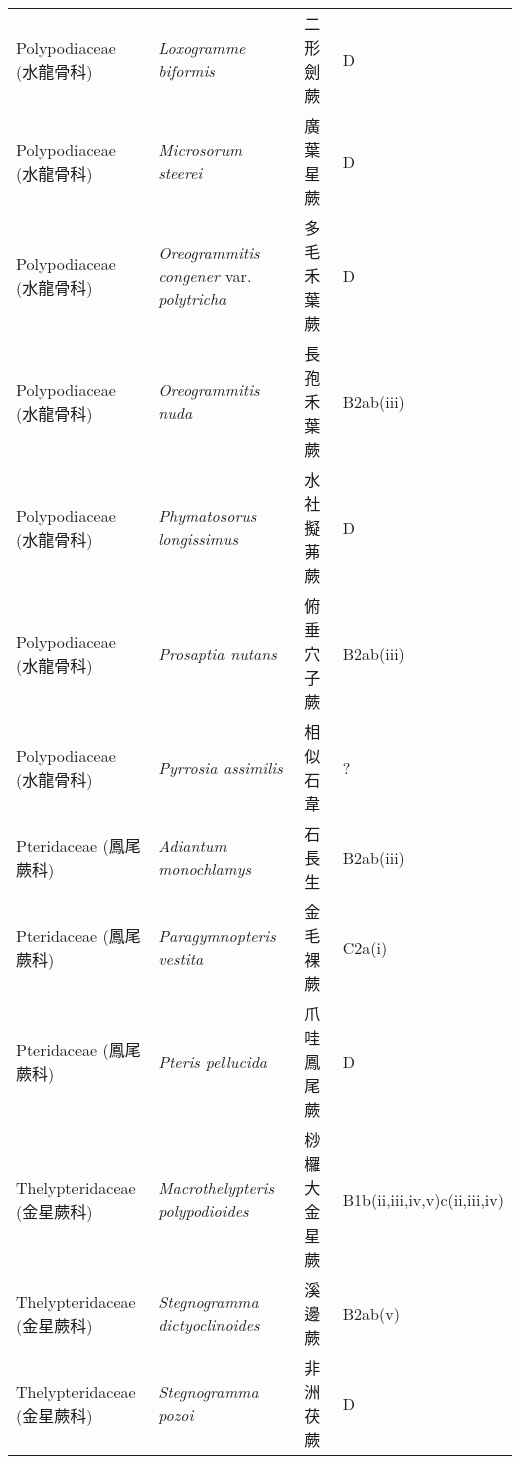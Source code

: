 \begin{longtable}{p{3cm}p{5cm}p{3cm}p{4cm}}
    Polypodiaceae (水龍骨科) & \textit{Loxogramme biformis}  & 二形劍蕨 & D \index{Loxogramme@\textit{Loxogramme}!biformis@\textit{biformis}}  \index{二形劍蕨} \\
    Polypodiaceae (水龍骨科) & \textit{Microsorum steerei}  & 廣葉星蕨 & D \index{Microsorum@\textit{Microsorum}!steerei@\textit{steerei}}  \index{廣葉星蕨} \\
    Polypodiaceae (水龍骨科) & \textit{Oreogrammitis congener} var. \textit{polytricha}  & 多毛禾葉蕨 & D \index{Oreogrammitis@\textit{Oreogrammitis}!congener@\textit{congener}!var. polytricha@var. \textit{polytricha}}  \index{多毛禾葉蕨} \\
    Polypodiaceae (水龍骨科) & \textit{Oreogrammitis nuda}  & 長孢禾葉蕨 & B2ab(iii) \index{Oreogrammitis@\textit{Oreogrammitis}!nuda@\textit{nuda}}  \index{長孢禾葉蕨} \\
    Polypodiaceae (水龍骨科) & \textit{Phymatosorus longissimus}  & 水社擬茀蕨 & D \index{Phymatosorus@\textit{Phymatosorus}!longissimus@\textit{longissimus}}  \index{水社擬茀蕨} \\
    Polypodiaceae (水龍骨科) & \textit{Prosaptia nutans}  & 俯垂穴子蕨 & B2ab(iii) \index{Prosaptia@\textit{Prosaptia}!nutans@\textit{nutans}}  \index{俯垂穴子蕨} \\
    Polypodiaceae (水龍骨科) & \textit{Pyrrosia assimilis}  & 相似石韋 & ? \index{Pyrrosia@\textit{Pyrrosia}!assimilis@\textit{assimilis}}  \index{相似石韋} \\
    Pteridaceae (鳳尾蕨科) & \textit{Adiantum monochlamys}  & 石長生 & B2ab(iii) \index{Adiantum@\textit{Adiantum}!monochlamys@\textit{monochlamys}}  \index{石長生} \\
    Pteridaceae (鳳尾蕨科) & \textit{Paragymnopteris vestita}  & 金毛裸蕨 & C2a(i) \index{Paragymnopteris@\textit{Paragymnopteris}!vestita@\textit{vestita}}  \index{金毛裸蕨} \\
    Pteridaceae (鳳尾蕨科) & \textit{Pteris pellucida}  & 爪哇鳳尾蕨 & D \index{Pteris@\textit{Pteris}!pellucida@\textit{pellucida}}  \index{爪哇鳳尾蕨} \\
    Thelypteridaceae (金星蕨科) & \textit{Macrothelypteris polypodioides}  & 桫欏大金星蕨 & B1b(ii,iii,iv,v)c(ii,iii,iv) \index{Macrothelypteris@\textit{Macrothelypteris}!polypodioides@\textit{polypodioides}}  \index{桫欏大金星蕨} \\
    Thelypteridaceae (金星蕨科) & \textit{Stegnogramma dictyoclinoides}  & 溪邊蕨 & B2ab(v) \index{Stegnogramma@\textit{Stegnogramma}!dictyoclinoides@\textit{dictyoclinoides}}  \index{溪邊蕨} \\
    Thelypteridaceae (金星蕨科) & \textit{Stegnogramma pozoi}  & 非洲茯蕨 & D \index{Stegnogramma@\textit{Stegnogramma}!pozoi@\textit{pozoi}}  \index{非洲茯蕨} \\
    \bottomrule
        \end{longtable}
